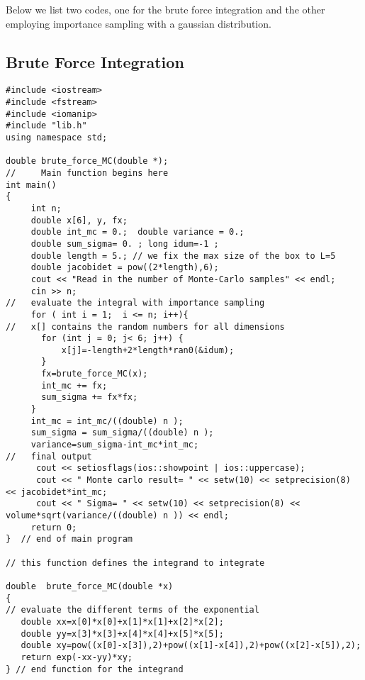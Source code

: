 Below we list two codes, one for the brute force integration
and the other employing importance sampling with a gaussian distribution.
\subsection{Brute Force Integration}
\begin{lstlisting}[title={\url{http://folk.uio.no/mhjensen/compphys/programs/chapter11/cpp/program4.cpp}}]
#include <iostream>
#include <fstream>
#include <iomanip>
#include "lib.h"
using namespace std;

double brute_force_MC(double *);
//     Main function begins here     
int main()
{
     int n;
     double x[6], y, fx; 
     double int_mc = 0.;  double variance = 0.;
     double sum_sigma= 0. ; long idum=-1 ;  
     double length = 5.; // we fix the max size of the box to L=5
     double jacobidet = pow((2*length),6);
     cout << "Read in the number of Monte-Carlo samples" << endl;
     cin >> n;
//   evaluate the integral with importance sampling    
     for ( int i = 1;  i <= n; i++){
//   x[] contains the random numbers for all dimensions
       for (int j = 0; j< 6; j++) {
           x[j]=-length+2*length*ran0(&idum);
       }
       fx=brute_force_MC(x); 
       int_mc += fx;
       sum_sigma += fx*fx;
     }
     int_mc = int_mc/((double) n );
     sum_sigma = sum_sigma/((double) n );
     variance=sum_sigma-int_mc*int_mc;
//   final output 
      cout << setiosflags(ios::showpoint | ios::uppercase);
      cout << " Monte carlo result= " << setw(10) << setprecision(8) << jacobidet*int_mc;
      cout << " Sigma= " << setw(10) << setprecision(8) << volume*sqrt(variance/((double) n )) << endl;
     return 0;
}  // end of main program 

// this function defines the integrand to integrate 
 
double  brute_force_MC(double *x) 
{
// evaluate the different terms of the exponential
   double xx=x[0]*x[0]+x[1]*x[1]+x[2]*x[2];
   double yy=x[3]*x[3]+x[4]*x[4]+x[5]*x[5];
   double xy=pow((x[0]-x[3]),2)+pow((x[1]-x[4]),2)+pow((x[2]-x[5]),2);
   return exp(-xx-yy)*xy;
} // end function for the integrand
\end{lstlisting}

